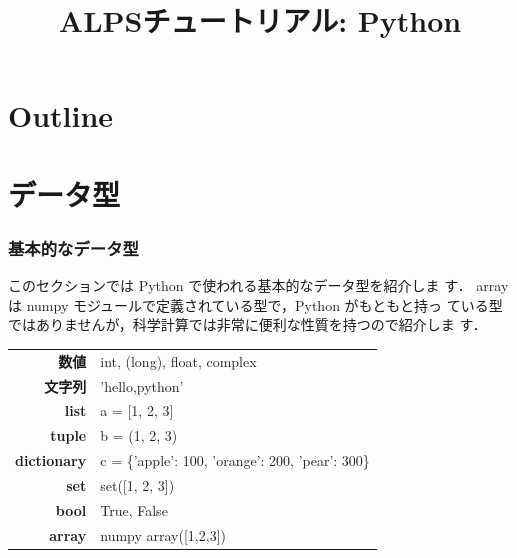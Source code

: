 
\title{ALPSチュートリアル: Python}



\begin{frame}
  \titlepage
\end{frame}

\section*{Outline}
\begin{frame}
  \tableofcontents
\end{frame}

\section{データ型}
\begin{frame}[t, fragile]
\frametitle{基本的なデータ型}

\alert{このセクションでは Python で使われる基本的なデータ型を紹介しま
す．} array は numpy モジュールで定義されている型で，Python がもともと持っ
ている型ではありませんが，科学計算では非常に便利な性質を持つので紹介しま
す．

\begin{table}[hb]
 \begin{tabular}{r|l} 
  \textbf{数値}       & int, (long), float, complex \\
  \textbf{文字列}     & 'hello,python' \\
  \textbf{list}       & a = [1, 2, 3] \\
  \textbf{tuple}      & b = (1, 2, 3) \\
  \textbf{dictionary} & c = \{'apple': 100, 'orange': 200, 'pear': 300\} \\
  \textbf{set}        & set([1, 2, 3]) \\
  \textbf{bool}       & True, False \\
  \textbf{array}      & numpy array([1,2,3]) \\
 \end{tabular}
\end{table}

\end{frame}

